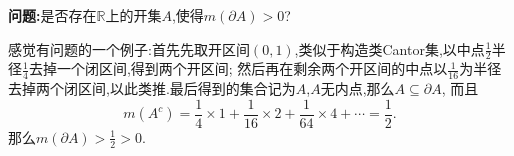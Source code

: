 \documentclass[12pt,a4paper,oneside]{ctexart}
\newcommand{\ptl}{\partial}
\newcommand{\R}{\mathbb{R}}
\begin{document}
  \textbf{问题:}是否存在$\R$上的开集$A$,使得$m(\ptl A)>0$?

  感觉有问题的一个例子:首先先取开区间$(0,1)$,类似于构造类Cantor集,以中点$\frac{1}{2}$半径$\frac{1}{4}$去掉一个闭区间,得到两个开区间;
  然后再在剩余两个开区间的中点以$\frac{1}{16}$为半径去掉两个闭区间,以此类推.最后得到的集合记为$A$,$A$无内点,那么$A\subseteq \ptl A$,
  而且
  \begin{equation*}
    m(A^c)=\frac{1}{4}\times 1+\frac{1}{16}\times 2+\frac{1}{64}\times 4+\cdots=\frac{1}{2}.
  \end{equation*}
  那么$m(\ptl A)>\frac{1}{2}>0$.
\end{document}
